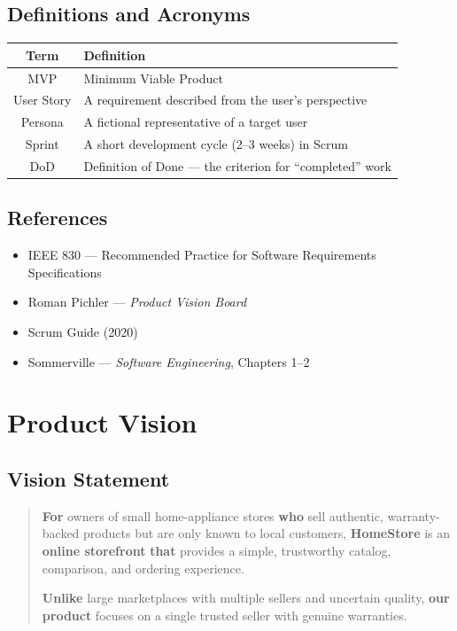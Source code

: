 \documentclass[12pt, a4paper]{article}
\begin{document}
\subsection{Definitions and Acronyms}
\begin{center}
\begin{tabular}{|c|p{9cm}|}
\hline
\textbf{Term} & \textbf{Definition} \\
\hline
MVP & Minimum Viable Product \\
\hline
User Story & A requirement described from the user's perspective \\
\hline
Persona & A fictional representative of a target user \\
\hline
Sprint & A short development cycle (2--3 weeks) in Scrum \\
\hline
DoD & Definition of Done --- the criterion for ``completed'' work \\
\hline
\end{tabular}
\end{center}

\subsection{References}
\begin{itemize}
    \item IEEE 830 --- Recommended Practice for Software Requirements Specifications
    \item Roman Pichler --- \textit{Product Vision Board}
    \item Scrum Guide (2020)
    \item Sommerville --- \textit{Software Engineering}, Chapters 1--2
\end{itemize}

\section{Product Vision}

\subsection{Vision Statement}

\begin{quote}
\textbf{For} owners of small home-appliance stores \textbf{who} sell authentic,
warranty-backed products but are only known to local customers,
\textbf{HomeStore} is an \textbf{online storefront}
\textbf{that} provides a simple, trustworthy catalog, comparison, and
ordering experience.

\textbf{Unlike} large marketplaces with multiple sellers and uncertain
quality, \textbf{our product} focuses on a single trusted seller with
genuine warranties.
\end{quote}
\end{document}
